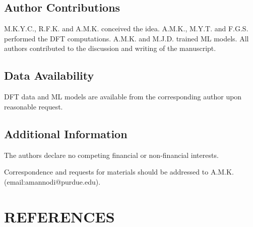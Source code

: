 \documentclass[aip, jmp, amsmath, amssymb]{revtex4-2}
\begin{document}
\subsection*{Author Contributions}
\label{sec:orgb0acb02}
M.K.Y.C., R.F.K. and A.M.K. conceived the idea. A.M.K., M.Y.T. and
F.G.S. performed the DFT computations. A.M.K. and M.J.D. trained ML
models. All authors contributed to the discussion and writing of the
manuscript.

\subsection*{Data Availability}
\label{sec:org039858c}
DFT data and ML models are available from the corresponding author upon
reasonable request.

\subsection*{Additional Information}
\label{sec:org049acd3}
The authors declare no competing financial or non-financial interests.

Correspondence and requests for materials should be addressed to A.M.K.
(email:amannodi@purdue.edu).

\section*{REFERENCES}
\label{sec:orgebb792c}


\end{document}
